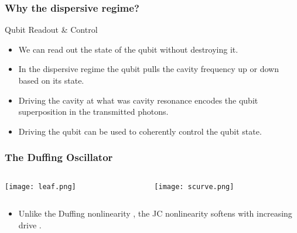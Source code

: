 \documentclass{beamer}
\begin{document}
\begin{frame}

    \frametitle{Why the dispersive regime?}

    \begin{block}{Qubit Readout \& Control}
        \begin{itemize}

            \item We can read out the state of the qubit 
                    without destroying it. 
            \item In the dispersive regime the qubit pulls the 
                    cavity frequency up or down based on its state.
            \item Driving the cavity at what was cavity 
                    resonance encodes the qubit superposition 
                    in the transmitted photons. 
            \item Driving the qubit can be used to coherently 
                    control the qubit state. 

        \end{itemize}
    \end{block}

\end{frame}
\begin{frame}

    \frametitle{The Duffing Oscillator}

    \begin{columns}[c]

        \begin{column}{0.5\linewidth}
            \texttt{[image: leaf.png]}
        \end{column}

        \begin{column}{0.5\linewidth}
            \texttt{[image: scurve.png]}
        \end{column}

    \end{columns}

    \begin{block}{}
        \begin{itemize}

            \item Unlike the Duffing nonlinearity 
                ,
                the JC nonlinearity softens with increasing drive
                .

        \end{itemize}
    \end{block}

\end{frame}
\begin{frame}

        

\end{frame}
\begin{frame}

    \printbibliography

\end{frame}
\end{document}

